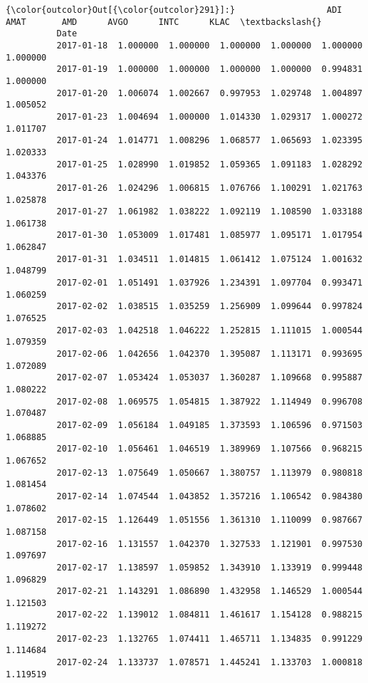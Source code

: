 \documentclass[11pt]{article}
\begin{document}
\begin{Verbatim}[commandchars=\\\{\}]
{\color{outcolor}Out[{\color{outcolor}291}]:}                  ADI      AMAT       AMD      AVGO      INTC      KLAC  \textbackslash{}
          Date                                                                     
          2017-01-18  1.000000  1.000000  1.000000  1.000000  1.000000  1.000000   
          2017-01-19  1.000000  1.000000  1.000000  1.000000  0.994831  1.000000   
          2017-01-20  1.006074  1.002667  0.997953  1.029748  1.004897  1.005052   
          2017-01-23  1.004694  1.000000  1.014330  1.029317  1.000272  1.011707   
          2017-01-24  1.014771  1.008296  1.068577  1.065693  1.023395  1.020333   
          2017-01-25  1.028990  1.019852  1.059365  1.091183  1.028292  1.043376   
          2017-01-26  1.024296  1.006815  1.076766  1.100291  1.021763  1.025878   
          2017-01-27  1.061982  1.038222  1.092119  1.108590  1.033188  1.061738   
          2017-01-30  1.053009  1.017481  1.085977  1.095171  1.017954  1.062847   
          2017-01-31  1.034511  1.014815  1.061412  1.075124  1.001632  1.048799   
          2017-02-01  1.051491  1.037926  1.234391  1.097704  0.993471  1.060259   
          2017-02-02  1.038515  1.035259  1.256909  1.099644  0.997824  1.076525   
          2017-02-03  1.042518  1.046222  1.252815  1.111015  1.000544  1.079359   
          2017-02-06  1.042656  1.042370  1.395087  1.113171  0.993695  1.072089   
          2017-02-07  1.053424  1.053037  1.360287  1.109668  0.995887  1.080222   
          2017-02-08  1.069575  1.054815  1.387922  1.114949  0.996708  1.070487   
          2017-02-09  1.056184  1.049185  1.373593  1.106596  0.971503  1.068885   
          2017-02-10  1.056461  1.046519  1.389969  1.107566  0.968215  1.067652   
          2017-02-13  1.075649  1.050667  1.380757  1.113979  0.980818  1.081454   
          2017-02-14  1.074544  1.043852  1.357216  1.106542  0.984380  1.078602   
          2017-02-15  1.126449  1.051556  1.361310  1.110099  0.987667  1.087158   
          2017-02-16  1.131557  1.042370  1.327533  1.121901  0.997530  1.097697   
          2017-02-17  1.138597  1.059852  1.343910  1.133919  0.999448  1.096829   
          2017-02-21  1.143291  1.086890  1.432958  1.146529  1.000544  1.121503   
          2017-02-22  1.139012  1.084811  1.461617  1.154128  0.988215  1.119272   
          2017-02-23  1.132765  1.074411  1.465711  1.134835  0.991229  1.114684   
          2017-02-24  1.133737  1.078571  1.445241  1.133703  1.000818  1.119519   

\end{Verbatim}
\end{document}
